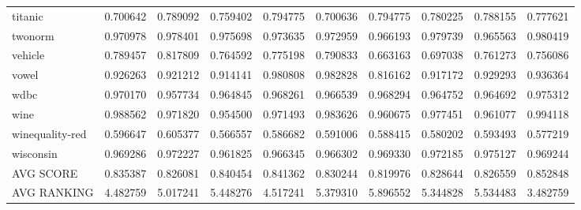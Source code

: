 \begin{tabular}{lrrrrrrrrr}
titanic         &             0.700642 &             0.789092 &            0.759402 &              0.794775 &              0.700636 &             0.794775 &      0.780225 &      0.788155 &     0.777621 \\
twonorm         &             0.970978 &             0.978401 &            0.975698 &              0.973635 &              0.972959 &             0.966193 &      0.979739 &      0.965563 &     0.980419 \\
vehicle         &             0.789457 &             0.817809 &            0.764592 &              0.775198 &              0.790833 &             0.663163 &      0.697038 &      0.761273 &     0.756086 \\
vowel           &             0.926263 &             0.921212 &            0.914141 &              0.980808 &              0.982828 &             0.816162 &      0.917172 &      0.929293 &     0.936364 \\
wdbc            &             0.970170 &             0.957734 &            0.964845 &              0.968261 &              0.966539 &             0.968294 &      0.964752 &      0.964692 &     0.975312 \\
wine            &             0.988562 &             0.971820 &            0.954500 &              0.971493 &              0.983626 &             0.960675 &      0.977451 &      0.961077 &     0.994118 \\
winequality-red &             0.596647 &             0.605377 &            0.566557 &              0.586682 &              0.591006 &             0.588415 &      0.580202 &      0.593493 &     0.577219 \\
wisconsin       &             0.969286 &             0.972227 &            0.961825 &              0.966345 &              0.966302 &             0.969330 &      0.972185 &      0.975127 &     0.969244 \\
AVG SCORE       &             0.835387 &             0.826081 &            0.840454 &              0.841362 &              0.830244 &             0.819976 &      0.828644 &      0.826559 &     0.852848 \\
AVG RANKING     &             4.482759 &             5.017241 &            5.448276 &              4.517241 &              5.379310 &             5.896552 &      5.344828 &      5.534483 &     3.482759 \\
\bottomrule
\end{tabular}
